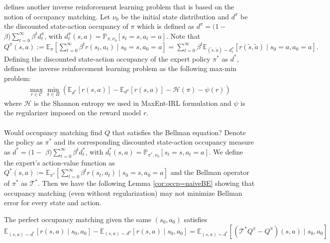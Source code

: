 \cite{ho2016generative} defines another inverse reinforcement learning problem that is based on the notion of occupancy matching. Let $\nu_0$ be the initial state distribution and $d^\pi$ be the discounted state-action occupancy of $\pi$ which is defined as $ d^\pi=(1-$ $\beta) \sum_{t=0}^{\infty} \beta^t d_t^\pi$, with $d_t^\pi(s, a)=\mathbb{P}_{\pi, \nu_0}\left[s_t=s, a_t=a\right]$. Note that $Q^\pi(s, a):=\mathbb{E}_\pi\left[\sum_{t=0}^{\infty} \beta^t r(s_t,a_t) \mid s_0=s, a_0=a\right] = \sum_{t=0}^{\infty} \beta^t \mathbb{E}_{(\tilde{s},\tilde{a})\sim d_t^\pi}[r(\tilde{s},\tilde{a})\mid s_0=a,a_0=a].$ Defining the discounted state-action occupancy of the expert policy $\pi^\ast$ as $d^\ast$, \cite{ho2016generative} defines the inverse reinforcement learning problem as the following max-min problem:
\begin{align}
    \underset{r \in \mathcal{C}}{\operatorname{max}}\underset{{\pi \in \Pi}}{\min}\left(\mathbb{E}_{d^\ast}[r(s, a)]-\mathbb{E}_{d^\pi}[r(s, a)]-\mathcal{H}(\pi)-\psi(r)\right) \label{eq:occupancyObj}
\end{align}
where $\mathcal{H}$ is the Shannon entropy we used in MaxEnt-IRL formulation and $\psi$ is the regularizer imposed on the reward model $r$.  
\;
\\
\;
\\
Would occupancy matching find $Q$ that satisfies the Bellman equation? Denote the policy as $\pi^\ast$ and its corresponding discounted state-action occupancy measure as $d^\ast=(1-$ $\beta) \sum_{t=0}^{\infty} \beta^t d_t^\ast$, with $d_t^\ast(s, a)=\mathbb{P}_{\pi^\ast, \nu_0}\left[s_t=s, a_t=a\right]$. We define the expert's action-value function as $Q^\ast(s, a):=\mathbb{E}_{\pi^\ast}\left[\sum_{t=0}^{\infty} \beta^t r(s_t,a_t) \mid s_0=s, a_0=a\right]$ and the Bellman operator of $\pi^\ast$ as $\mathcal{T}^\ast$. Then we have the following Lemma \ref{cor:occp=naiveBE} showing that occupancy matching (even without regularization) may not minimize Bellman error for every state and action.
\begin{lem}\label{cor:occp=naiveBE} The perfect occupancy matching given the same $(s_0, a_0)$ satisfies
    $$\mathbb{E}_{(s, a) \sim d^\ast}[r(s, a)\mid s_0, a_0]-\mathbb{E}_{(s, a) \sim d^\pi}[r(s, a)\mid s_0, a_0] = \mathbb{E}_{(s,a)\sim d^{\ast}}[(\mathcal{T}^\ast Q^\pi-Q^\pi)(s,a)\mid s_0, a_0]$$
\end{lem}
